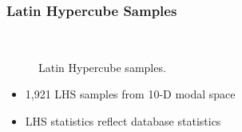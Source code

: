 \documentclass[9pt]{beamer}
\begin{document}
\begin{frame}
\frametitle{Latin Hypercube Samples}
\label{sec-2-11}

\vspace*{-0.0cm}\begin{figure}
      \vspace*{-1.5cm} \\
      \vspace*{-0.5cm}
      \vspace*{-0.5cm}
      \caption{Latin Hypercube samples.}
\end{figure}
\begin{itemize}
\item 1,921 LHS samples from 10-D modal space
\item LHS statistics reflect database statistics
\end{itemize}
\end{frame}
\end{document}
